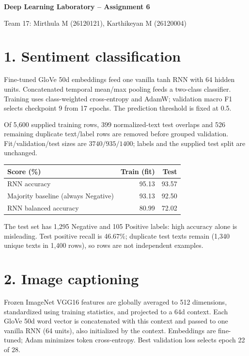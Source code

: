 \documentclass[10pt,a4paper]{article}
\begin{document}
\begin{center}
    {\Large\bfseries Deep Learning Laboratory -- Assignment 6}\par
    \vspace{1mm}
    {\small Team 17: Mirthula M (26120121), Karthikeyan M (26120004)}
\end{center}

\section*{1. Sentiment classification}

Fine-tuned GloVe 50d embeddings feed one vanilla tanh RNN with 64 hidden units.
Concatenated temporal mean/max pooling feeds a two-class classifier.
Training uses class-weighted cross-entropy and AdamW; validation macro F1 selects
checkpoint 9 from 17 epochs. The prediction threshold is fixed at 0.5.

Of 5,600 supplied training rows, 399 normalized-text test overlaps and
526 remaining duplicate text/label rows are removed before grouped validation.
Fit/validation/test sizes are $3740/935/1400$; labels and the supplied test split are unchanged.

\begin{center}
\small
\begin{tabular}{lrr}
\toprule
Score (\%) & Train (fit) & Test\\
\midrule
RNN accuracy & 95.13 & 93.57\\
Majority baseline (always Negative) & 93.13 & 92.50\\
RNN balanced accuracy & 80.99 & 72.02\\
\bottomrule
\end{tabular}
\end{center}

The test set has 1,295 Negative and 105 Positive labels: high accuracy alone is
misleading. Test positive recall is 46.67\%; duplicate test texts remain
(1,340 unique texts in 1,400 rows), so rows are not independent examples.

\section*{2. Image captioning}

Frozen ImageNet VGG16 features are globally averaged to 512 dimensions,
standardized using training statistics, and projected to a 64d context.
Each GloVe 50d word vector is concatenated with this context and passed to one
vanilla RNN (64 units), also initialized by the context. Embeddings are fine-tuned;
Adam minimizes token cross-entropy. Best validation loss selects epoch
22 of 28.
\end{document}
